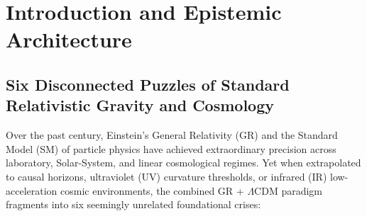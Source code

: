 \documentclass[11pt,a4paper]{article}
\theoremstyle{remark}
\begin{document}
\begin{abstract}
\textbf{(D5)} Local $S_4(\sigma)\times S_4(\sigma')$ face-gauge locking restricts bulk director modes to horizon cuts of simplicial cutoff $\ell_* = \sqrt{24\pi}\,\ell_P$, yielding $S_H/k_B = 6\pi(A_H/\ell_*^2)$ ($18.85\,k_B$ per plaquette), a regular Hawking temperature peaking at $r_+ = 3\ell_*$ ($T_{H,\max} = 2.89 \times 10^{29}\;\mathrm{K}$) before cooling with $C_{\mathrm{BH}} > 0$ to a zero-temperature extremal $K_4$ Seed Remnant ($r_{\mathrm{ext}} = \sqrt{3}\ell_*$, $M_{\mathrm{rem}} = 11.28\,M_P$, $S_{\mathrm{rem}}/k_B = 72\pi^2 \approx 710.61$), $121.08$ decades of cosmic horizon entropy growth from $\mathcal{C}_{\mathrm{Weyl}} = 0$ to $S_{\mathrm{CH}}(0)/k_B = 2.27 \times 10^{122}$, and a unitary Page curve via the elliptic Gauss constraint $-\Delta_A\Phi_{K_4}$ ($D_{OS}^{\mathrm{op}} > 0$). Finally, we validate all $k = 0$ predictions against EHT Sgr A* ($0.49\sigma$) and M87* ($0.77\sigma$, halo onset $\ell_\tau = 3.17\;\mathrm{kpc}$), GW170817, PSR J0737-3039A/B, GW150914, Planck PR3 CMB ($0.06\sigma$), JWST $z = 14.18$, 43 high-$z$ disks ($\Delta\chi^2 = -88.78$ vs.\ $\Lambda\mathrm{CDM}$), 15 Cosmic Chronometers ($\chi^2/\mathrm{dof} = 0.38$), $18,983$ live ESA Euclid DR1 records, and the Eridanus Supervoid ISW decrement ($0.43\sigma$), while maintaining \texttt{NATURE\_\allowbreak LEVEL\_\allowbreak CLOSURE = false}.
\end{abstract}

\tableofcontents
\newpage

\section{Introduction and Epistemic Architecture}
\label{sec:intro}

\subsection{Six Disconnected Puzzles of Standard Relativistic Gravity and Cosmology}

Over the past century, Einstein's General Relativity (GR) \cite{HawkingEllis1973} and the Standard Model (SM) of particle physics have achieved extraordinary precision across laboratory, Solar-System, and linear cosmological regimes. Yet when extrapolated to causal horizons, ultraviolet (UV) curvature thresholds, or infrared (IR) low-acceleration cosmic environments, the combined GR + $\Lambda\mathrm{CDM}$ paradigm fragments into six seemingly unrelated foundational crises:
\end{document}

